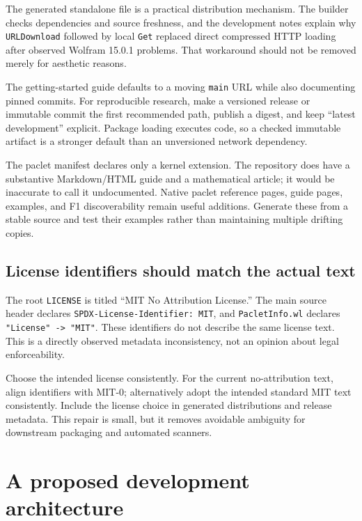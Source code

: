 The generated standalone file is a practical distribution mechanism. The builder checks dependencies and source freshness, and the development notes explain why \texttt{URLDownload} followed by local \texttt{Get} replaced direct compressed HTTP loading after observed Wolfram 15.0.1 problems. That workaround should not be removed merely for aesthetic reasons.\cite{development}

The getting-started guide defaults to a moving \texttt{main} URL while also documenting pinned commits. For reproducible research, make a versioned release or immutable commit the first recommended path, publish a digest, and keep ``latest development'' explicit. Package loading executes code, so a checked immutable artifact is a stronger default than an unversioned network dependency.

The paclet manifest declares only a kernel extension. The repository does have a substantive Markdown/HTML guide and a mathematical article; it would be inaccurate to call it undocumented. Native paclet reference pages, guide pages, examples, and F1 discoverability remain useful additions. Generate these from a stable source and test their examples rather than maintaining multiple drifting copies.\cite{paclet,guide,development}

\subsection{License identifiers should match the actual text}

The root \texttt{LICENSE} is titled ``MIT No Attribution License.'' The main source header declares \texttt{SPDX-License-Identifier: MIT}, and \texttt{PacletInfo.wl} declares \texttt{"License" -> "MIT"}. These identifiers do not describe the same license text. This is a directly observed metadata inconsistency, not an opinion about legal enforceability.\cite{license,core,paclet}

Choose the intended license consistently. For the current no-attribution text, align identifiers with MIT-0; alternatively adopt the intended standard MIT text consistently. Include the license choice in generated distributions and release metadata. This repair is small, but it removes avoidable ambiguity for downstream packaging and automated scanners.

\section{A proposed development architecture}
\label{sec:architecture}

